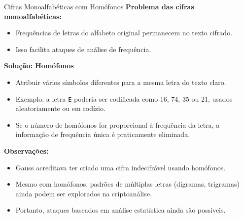 \begin{frame}{Cifras Monoalfabéticas com Homófonos}
\textbf{Problema das cifras monoalfabéticas:}  
\begin{itemize}
    \item Frequências de letras do alfabeto original permanecem no texto cifrado.  
    \item Isso facilita ataques de análise de frequência.
\end{itemize}

\medskip
\textbf{Solução: Homófonos}  
\begin{itemize}
    \item Atribuir vários símbolos diferentes para a mesma letra do texto claro.  
    \item Exemplo: a letra \texttt{E} poderia ser codificada como 16, 74, 35 ou 21, usados aleatoriamente ou em rodízio.  
    \item Se o número de homófonos for proporcional à frequência da letra, a informação de frequência única é praticamente eliminada.
\end{itemize}

\medskip
\textbf{Observações:}  
\begin{itemize}
    \item Gauss acreditava ter criado uma cifra indecifrável usando homófonos.  
    \item Mesmo com homófonos, padrões de múltiplas letras (digramas, trigramas) ainda podem ser explorados na criptoanálise.  
    \item Portanto, ataques baseados em análise estatística ainda são possíveis.
\end{itemize}
\end{frame}

